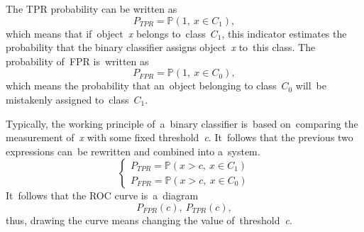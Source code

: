 \documentclass[]{scrreprt}
\begin{document}
%
The TPR probability can be written as
\begin{equation}\label{eq:TPR-probability}
P_{TPR} = \mathbb{P}(1,\ x\in C_{1}),
\end{equation}
which means that if~object~\textit{x} belongs to~class~$C_{1}$, this indicator estimates the probability that the binary classifier assigns object~\textit{x} to~this class. The probability of~FPR is~written as
\begin{equation}\label{eq:FPR-probability}
P_{FPR} = \mathbb{P}(1,\ x\in C_{0}),
\end{equation}
which means the probability that an~object belonging to class~$C_0$ will~be mistakenly assigned to~class~$C_1$.

Typically, the working principle of~a~binary classifier is~based on~comparing the measurement of~\textit{x} with some fixed threshold~\textit{c}. It~follows that the previous two expressions can~be rewritten and combined into a~system.
\begin{equation}\label{eq:TRP+FPR-probability}
\begin{cases}
P_{TPR} = \mathbb{P}(x>c,\ x \in C_{1})\\
P_{FPR} = \mathbb{P}(x>c,\ x \in C_{0})
\end{cases}
\end{equation}
It~follows that the ROC curve is~a~diagram
\begin{equation}\label{eq:ROC-contour}
P_{FPR}(c),\ P_{TPR}(c),
\end{equation}
thus, drawing the curve means changing the value of~threshold~\textit{c}.
\end{document}
